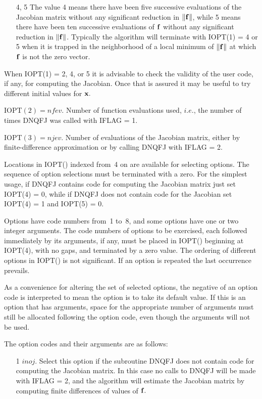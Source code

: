 \documentclass[twoside]{MATH77}
\begin{document}
\begin{description}
\begin{itemize}
\item[4, 5]  The value 4 means there have been five successive evaluations
of the Jacobian matrix without any significant reduction in $\Vert {\bf f}%
\Vert $, while 5 means there have been ten successive evaluations of ${\bf f}
$ without any significant reduction in $\Vert {\bf f}\Vert $. Typically the
algorithm will terminate with IOPT(1) = 4 or 5 when it is trapped in the
neighborhood of a local minimum of $\Vert {\bf f}\Vert $ at which ${\bf f}$
is not the zero vector.
\end{itemize}

When IOPT(1) = 2, 4, or 5 it is advisable to check the validity of the user
code, if any, for computing the Jacobian. Once that is assured it may be
useful to try different initial values for ${\bf x}.$

IOPT$(2)=nfev$. Number of function evaluations used, $i.e.$, the number of
times DNQFJ was called with IFLAG = 1.

IOPT$(3)=njev$. Number of evaluations of the Jacobian matrix, either by
finite-difference approximation or by calling DNQFJ with IFLAG =
2.\vspace{5pt}

Locations in IOPT() indexed from~4 on are available for selecting options.
The sequence of option selections must be terminated with a zero. For the
simplest usage, if DNQFJ contains code for computing the Jacobian matrix
just set IOPT(4) = 0, while if DNQFJ does not contain code for the Jacobian
set IOPT(4) = 1 and IOPT(5) = 0.

Options have code numbers from~1 to~8, and some options have one or two
integer arguments. The code numbers of options to be exercised, each
followed immediately by its arguments, if any, must be placed in IOPT()
beginning at IOPT(4), with no gaps, and terminated by a zero value. The
ordering of different options in IOPT() is not significant. If an option is
repeated the last occurrence prevails.

As a convenience for altering the set of selected options, the negative of
an option code is interpreted to mean the option is to take its default
value. If this is an option that has arguments, space for the appropriate
number of arguments must still be allocated following the option code, even
though the arguments will not be used.

The option codes and their arguments are as follows:

\begin{itemize}
\item[1]  $inoj$. Select this option if the subroutine DNQFJ does not
contain code for computing the Jacobian matrix. In this case no calls to
DNQFJ will be made with IFLAG = 2, and the algorithm will estimate the
Jacobian matrix by computing finite differences of values of ${\bf f}.$


\end{itemize}
\end{description}
\end{document}
